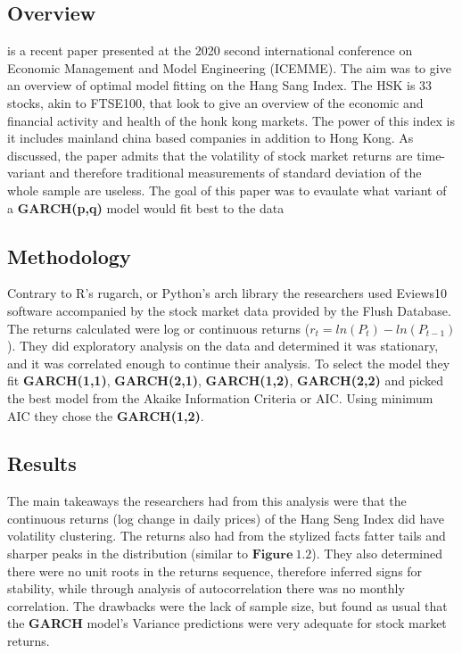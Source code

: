 \subsection{Overview}
\cite{LR2} is a recent paper presented at the 2020 second international conference on Economic Management and Model Engineering (ICEMME). The aim was to give an overview of optimal model fitting on the Hang Sang Index. The HSK is 33 stocks, akin to FTSE100, that look to give an overview of the economic and financial activity and health of the honk kong markets. The power of this index is it includes mainland china based companies in addition to Hong Kong. As discussed, the paper admits that the volatility of stock market returns are time-variant and therefore traditional measurements of standard deviation of the whole sample are useless. The goal of this paper was to evaulate what variant of a \textbf{GARCH(p,q)} model would fit best to the data
\subsection{Methodology}
Contrary to R's rugarch, or Python's arch library the researchers used Eviews10 software accompanied by the stock market data provided by the Flush Database. The returns calculated were log or continuous returns ($r_t = ln(P_t)-ln(P_{t-1})$). They did exploratory analysis on the data and determined it was stationary, and it was correlated enough to continue their analysis. To select the model they fit \textbf{GARCH(1,1)}, \textbf{GARCH(2,1)}, \textbf{GARCH(1,2)}, \textbf{GARCH(2,2)} and picked the best model from the Akaike Information Criteria or AIC. Using minimum AIC they chose the \textbf{GARCH(1,2)}. 

\subsection{Results}
The main takeaways the researchers had from this analysis were that the continuous returns (log change in daily prices) of the Hang Seng Index did have volatility clustering. The returns also had from the stylized facts fatter tails and sharper peaks in the distribution (similar to $\mathbf{Figure~1.2}$). They also determined there were no unit roots in the returns sequence, therefore inferred signs for stability, while through analysis of autocorrelation there was no monthly correlation. The drawbacks were the lack of sample size, but found as usual that the \textbf{GARCH} model's Variance predictions were very adequate for stock market returns. 

